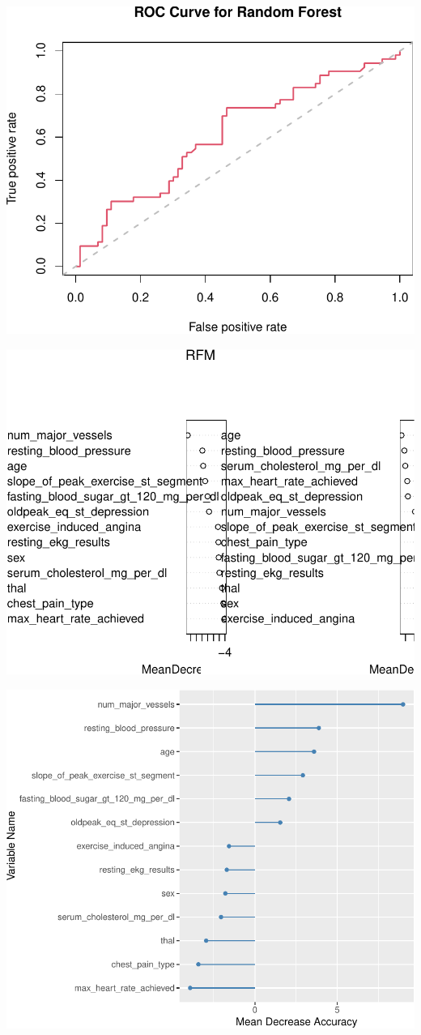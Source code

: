 \documentclass[11pt,preprint, authoryear]{elsarticle}
\numberwithin{equation}{section}
\numberwithin{figure}{section}
\numberwithin{table}{section}
\begin{document}
\includegraphics{ML_change_files/figure-latex/unnamed-chunk-18-1.pdf}

\includegraphics{ML_change_files/figure-latex/unnamed-chunk-19-1.pdf}

\includegraphics{ML_change_files/figure-latex/unnamed-chunk-20-1.pdf}
\end{document}
